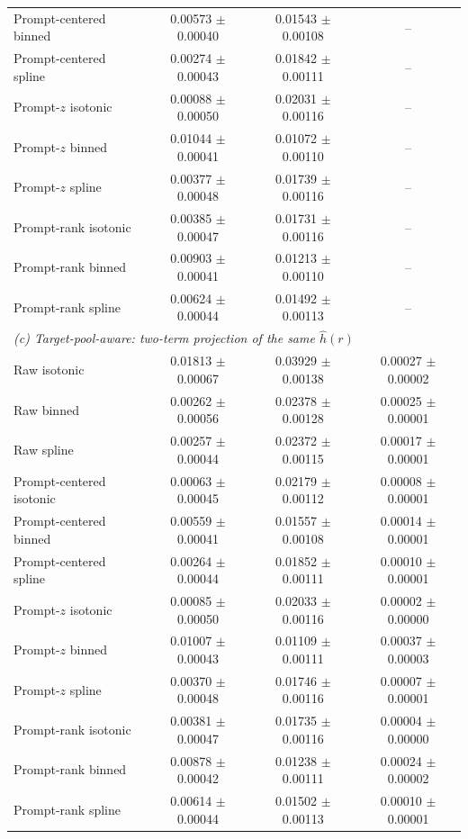 \begin{tabular}{lccc}
Prompt-centered binned & 0.00573 $\pm$ 0.00040 & 0.01543 $\pm$ 0.00108 & -- \\
Prompt-centered spline & 0.00274 $\pm$ 0.00043 & 0.01842 $\pm$ 0.00111 & -- \\
Prompt-$z$ isotonic & 0.00088 $\pm$ 0.00050 & 0.02031 $\pm$ 0.00116 & -- \\
Prompt-$z$ binned & 0.01044 $\pm$ 0.00041 & 0.01072 $\pm$ 0.00110 & -- \\
Prompt-$z$ spline & 0.00377 $\pm$ 0.00048 & 0.01739 $\pm$ 0.00116 & -- \\
Prompt-rank isotonic & 0.00385 $\pm$ 0.00047 & 0.01731 $\pm$ 0.00116 & -- \\
Prompt-rank binned & 0.00903 $\pm$ 0.00041 & 0.01213 $\pm$ 0.00110 & -- \\
Prompt-rank spline & 0.00624 $\pm$ 0.00044 & 0.01492 $\pm$ 0.00113 & -- \\
\midrule
\multicolumn{4}{l}{\textit{(c) Target-pool-aware: two-term projection of the same $\hat h(r)$}} \\
Raw isotonic & 0.01813 $\pm$ 0.00067 & 0.03929 $\pm$ 0.00138 & 0.00027 $\pm$ 0.00002 \\
Raw binned & 0.00262 $\pm$ 0.00056 & 0.02378 $\pm$ 0.00128 & 0.00025 $\pm$ 0.00001 \\
Raw spline & 0.00257 $\pm$ 0.00044 & 0.02372 $\pm$ 0.00115 & 0.00017 $\pm$ 0.00001 \\
Prompt-centered isotonic & 0.00063 $\pm$ 0.00045 & 0.02179 $\pm$ 0.00112 & 0.00008 $\pm$ 0.00001 \\
Prompt-centered binned & 0.00559 $\pm$ 0.00041 & 0.01557 $\pm$ 0.00108 & 0.00014 $\pm$ 0.00001 \\
Prompt-centered spline & 0.00264 $\pm$ 0.00044 & 0.01852 $\pm$ 0.00111 & 0.00010 $\pm$ 0.00001 \\
Prompt-$z$ isotonic & 0.00085 $\pm$ 0.00050 & 0.02033 $\pm$ 0.00116 & 0.00002 $\pm$ 0.00000 \\
Prompt-$z$ binned & 0.01007 $\pm$ 0.00043 & 0.01109 $\pm$ 0.00111 & 0.00037 $\pm$ 0.00003 \\
Prompt-$z$ spline & 0.00370 $\pm$ 0.00048 & 0.01746 $\pm$ 0.00116 & 0.00007 $\pm$ 0.00001 \\
Prompt-rank isotonic & 0.00381 $\pm$ 0.00047 & 0.01735 $\pm$ 0.00116 & 0.00004 $\pm$ 0.00000 \\
Prompt-rank binned & 0.00878 $\pm$ 0.00042 & 0.01238 $\pm$ 0.00111 & 0.00024 $\pm$ 0.00002 \\
Prompt-rank spline & 0.00614 $\pm$ 0.00044 & 0.01502 $\pm$ 0.00113 & 0.00010 $\pm$ 0.00001 \\

\end{tabular}
